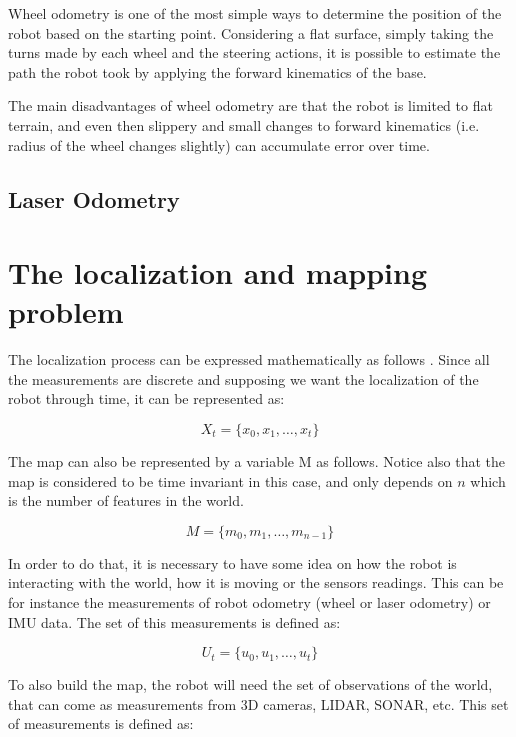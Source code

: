 Wheel odometry is one of the most simple ways to determine the position of the robot based on the starting point. Considering a flat surface, simply taking the turns made by each wheel and the steering actions, it is possible to estimate the path the robot took by applying the forward kinematics of the base.

The main disadvantages of wheel odometry are that the robot is limited to flat terrain, and even then slippery and small changes to forward kinematics (i.e. radius of the wheel changes slightly) can accumulate error over time.

\subsection{Laser Odometry}


\section{The localization and mapping problem}

The localization process can be expressed mathematically as follows \cite{thrun2005probabilistic}. Since all the measurements are discrete and supposing we want the localization of the robot through time, it can be represented as:

\begin{equation}\label{eq:x}
    X_t = \{x_0, x_1, \dots, x_t\} 
\end{equation}

The map can also be represented by a variable M as follows. Notice also that the map is considered to be time invariant in this case, and only depends on $n$ which is the number of features in the world.

\begin{equation}
    M = \{m_0, m_1, \dots, m_{n - 1}\}
\end{equation}

In order to do that, it is necessary to have some idea on how the robot is interacting with the world, how it is moving or the sensors readings. This can be for instance the measurements of robot odometry (wheel or laser odometry) or IMU data. The set of this measurements is defined as:

\begin{equation}
    U_t = \{u_0, u_1, \dots, u_t\}
\end{equation}

To also build the map, the robot will need the set of observations of the world, that can come as measurements from 3D cameras, LIDAR, SONAR, etc. This set of measurements is defined as:


